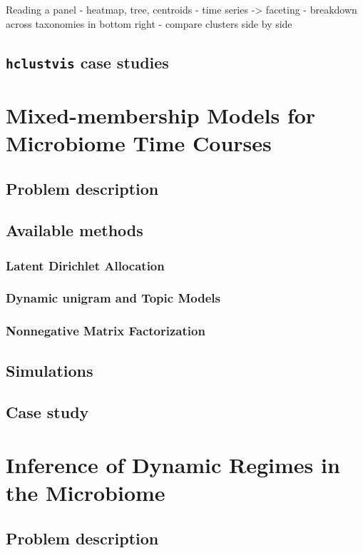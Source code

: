 \documentclass{report}
\begin{document}
Reading a panel
- heatmap, tree, centroids
- time series -> faceting
- breakdown across taxonomies in bottom right
- compare clusters side by side

\section{\texttt{hclustvis} case studies}

\chapter{Mixed-membership Models for Microbiome Time Courses}

\section{Problem description}

\section{Available methods}

\subsection{Latent Dirichlet Allocation}

\subsection{Dynamic unigram and Topic Models}

\subsection{Nonnegative Matrix Factorization}

\section{Simulations}

\section{Case study}

\chapter{Inference of Dynamic Regimes in the Microbiome}

\section{Problem description}
\end{document}
